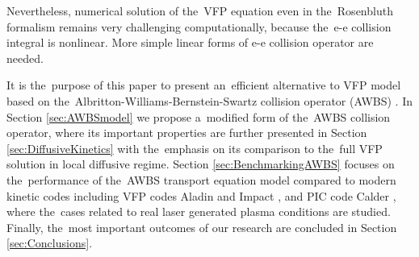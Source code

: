 

Nevertheless, numerical solution of the~VFP equation even in the~Rosenbluth
formalism remains very challenging computationally, because the~e-e collision
integral is nonlinear. More simple linear forms of e-e collision operator
are needed.

It is the~purpose of this paper to present an~efficient alternative 
to VFP model based on the~Albritton-Williams-Bernstein-Swartz 
collision operator (AWBS) \cite{AWBS_PRL1986}.
In Section \ref{sec:AWBSmodel} we propose a~modified form of 
the~AWBS collision operator, where its important properties are further
presented in Section \ref{sec:DiffusiveKinetics} with the~emphasis on its
comparison to the~full VFP solution in local diffusive regime. 
Section \ref{sec:BenchmarkingAWBS} focuses on the~performance of the~AWBS 
transport equation model compared to modern kinetic codes including VFP codes
Aladin and Impact \cite{Kingham_JCP2004}, and PIC code Calder 
\cite{Perez_PoP2012}, where the~cases related to real
laser generated plasma conditions are studied. Finally, the~most important
outcomes of our research are concluded in Section \ref{sec:Conclusions}. 
